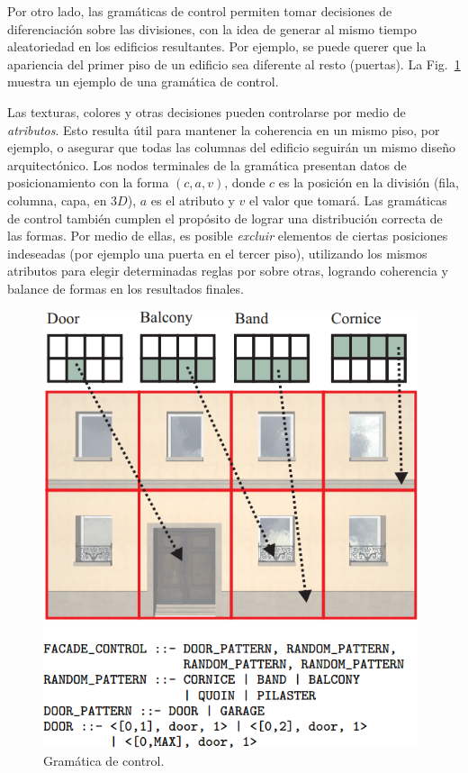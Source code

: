 Por otro lado, las gramáticas de control permiten tomar decisiones de diferenciación sobre las divisiones, con la idea de generar al mismo tiempo aleatoriedad en los edificios resultantes.
Por ejemplo, se puede querer que la apariencia del primer piso de un edificio sea diferente al resto (puertas).
La Fig.~\ref{fg:controlgrammar} muestra un ejemplo de una gramática de control.

Las texturas, colores y otras decisiones pueden controlarse por medio de {\em atributos}.
Esto resulta útil para mantener la coherencia en un mismo piso, por ejemplo, o asegurar que todas las columnas del edificio seguirán un mismo diseño arquitectónico.
Los nodos terminales de la gramática presentan datos de posicionamiento con la forma $(c,a,v)$, donde $c$ es la posición en la división (fila, columna, capa, en $3D$), $a$ es el atributo y $v$ el valor que tomará.
Las gramáticas de control también cumplen el propósito de lograr una distribución correcta de las formas.
Por medio de ellas, es posible {\em excluir} elementos de ciertas posiciones indeseadas (por ejemplo una puerta en el tercer piso), utilizando los mismos atributos para elegir determinadas reglas por sobre otras, logrando coherencia y balance de formas en los resultados finales.

\begin{figure}
\center
\includegraphics[width=11cm]{figures/controlgrammar}
\caption{Gramática de control.}
\label{fg:controlgrammar}
\end{figure}


